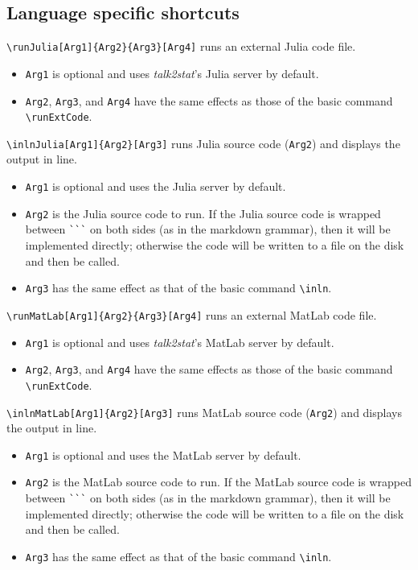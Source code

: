 \documentclass{ltxdoc}
\begin{document}
\subsection{Language specific shortcuts}
\verb|\runJulia[Arg1]{Arg2}{Arg3}[Arg4]| runs an external Julia code file.
\begin{itemize}
\item \texttt{Arg1} is optional and uses \textit{talk2stat}'s Julia server by default.
\item \texttt{Arg2}, \texttt{Arg3}, and \texttt{Arg4} have the same effects as those of the basic command \verb|\runExtCode|. 
\end{itemize}

\noindent \verb|\inlnJulia[Arg1]{Arg2}[Arg3]| runs Julia source code (\texttt{Arg2}) and displays the output in line.
\begin{itemize}
\item \texttt{Arg1} is optional and uses the Julia server by default.
\item \texttt{Arg2} is the Julia source code to run. If the Julia source code is wrapped between \verb|```|  on both sides (as in the markdown grammar), then it will be implemented directly; otherwise the code will be written to a file on the disk and then be called.
\item \texttt{Arg3} has the same effect as that of the basic command \verb|\inln|.
\end{itemize}

\bigskip
\noindent \verb|\runMatLab[Arg1]{Arg2}{Arg3}[Arg4]| runs an external MatLab code file.
\begin{itemize}
\item \texttt{Arg1} is optional and uses \textit{talk2stat}'s MatLab server by default.
\item \texttt{Arg2}, \texttt{Arg3}, and \texttt{Arg4} have the same effects as those of the basic command \verb|\runExtCode|. 
\end{itemize}

\noindent 
\verb|\inlnMatLab[Arg1]{Arg2}[Arg3]| runs MatLab source code (\texttt{Arg2}) and displays the output in line.
\begin{itemize}
\item \texttt{Arg1} is optional and uses the MatLab server by default.
\item \texttt{Arg2} is the MatLab source code to run. If the MatLab source code is wrapped between \verb|```| on both sides (as in the markdown grammar), then it will be implemented directly; otherwise the code will be written to a file on the disk and then be called.
\item \texttt{Arg3} has the same effect as that of the basic command \verb|\inln|.
\end{itemize}
\end{document}

